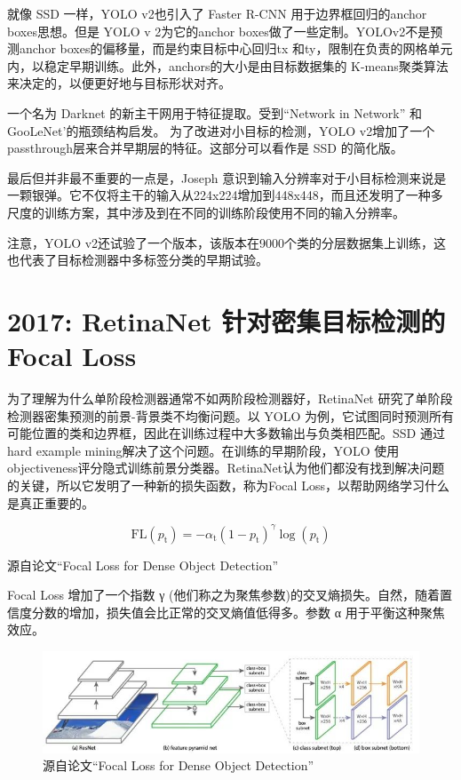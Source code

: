 \documentclass{article}
\begin{document}
	   	就像 SSD 一样，YOLO v2也引入了 Faster R-CNN 用于边界框回归的anchor boxes思想。但是 YOLO v 2为它的anchor boxes做了一些定制。YOLOv2不是预测anchor boxes的偏移量，而是约束目标中心回归tx 和ty，限制在负责的网格单元内，以稳定早期训练。此外，anchors的大小是由目标数据集的 K-means聚类算法来决定的，以便更好地与目标形状对齐。
	   	
	   	
	   	一个名为 Darknet 的新主干网用于特征提取。受到“Network in Network” 和GooLeNet’的瓶颈结构启发。
	   	为了改进对小目标的检测，YOLO v2增加了一个passthrough层来合并早期层的特征。这部分可以看作是 SSD 的简化版。
	   	
	   	最后但并非最不重要的一点是，Joseph 意识到输入分辨率对于小目标检测来说是一颗银弹。它不仅将主干的输入从224x224增加到448x448，而且还发明了一种多尺度的训练方案，其中涉及到在不同的训练阶段使用不同的输入分辨率。
	   	
	   	注意，YOLO v2还试验了一个版本，该版本在9000个类的分层数据集上训练，这也代表了目标检测器中多标签分类的早期试验。
	   	
	   	
	   	\section{2017: RetinaNet 针对密集目标检测的Focal Loss} 
	   	为了理解为什么单阶段检测器通常不如两阶段检测器好，RetinaNet 研究了单阶段检测器密集预测的前景-背景类不均衡问题。以 YOLO 为例，它试图同时预测所有可能位置的类和边界框，因此在训练过程中大多数输出与负类相匹配。SSD 通过 hard example mining解决了这个问题。在训练的早期阶段，YOLO 使用objectiveness评分隐式训练前景分类器。RetinaNet认为他们都没有找到解决问题的关键，所以它发明了一种新的损失函数，称为Focal Loss，以帮助网络学习什么是真正重要的。
	   	
	   	$$\mathrm{FL}\left(p_{\mathrm{t}}\right)=-\alpha_{\mathrm{t}}\left(1-p_{\mathrm{t}}\right)^{\gamma} \log \left(p_{\mathrm{t}}\right)$$
	   	
	   	源自论文“Focal Loss for Dense Object Detection”
	   	
	   	Focal Loss 增加了一个指数 γ (他们称之为聚焦参数)的交叉熵损失。自然，随着置信度分数的增加，损失值会比正常的交叉熵值低得多。参数 α 用于平衡这种聚焦效应。
	   	
	   	\begin{figure}[htpb]
	   		\centering
	   		\includegraphics[width=\linewidth]{detectfig/11.jpg}
	   		\caption{源自论文“Focal Loss for Dense Object Detection”}
	   	\end{figure}
	   	
\end{document}
